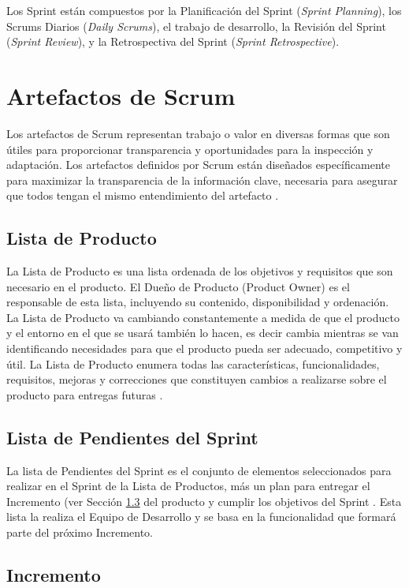 Los Sprint están compuestos por la Planificación del Sprint (\textit{Sprint Planning}), los Scrums Diarios (\textit{Daily Scrums}), el trabajo de desarrollo, la Revisión del Sprint (\textit{Sprint Review}), y la Retrospectiva del Sprint (\textit{Sprint Retrospective}). 

\section{Artefactos de Scrum}
Los artefactos de Scrum representan trabajo o valor en diversas formas que son útiles para proporcionar transparencia y oportunidades para la inspección y adaptación. Los artefactos definidos por Scrum están diseñados específicamente para maximizar la transparencia de la información clave, necesaria para asegurar que todos tengan el mismo entendimiento del artefacto \cite{scrumSchwaber}.

\subsection{Lista de Producto} \label{productBacklog}
La Lista de Producto es una lista ordenada de los objetivos y requisitos que son necesario en el producto. El Dueño de Producto (Product Owner) es el responsable de esta lista, incluyendo su contenido, disponibilidad y ordenación. La Lista de Producto va cambiando constantemente a medida de que el producto y el entorno en el que se usará también lo hacen, es decir cambia mientras se van identificando necesidades para que el producto pueda ser adecuado, competitivo y útil. La Lista de Producto enumera todas las características, funcionalidades, requisitos, mejoras y correcciones que constituyen cambios a realizarse sobre el producto para entregas futuras \cite{scrumSchwaber}.

\subsection{Lista de Pendientes del Sprint} \label{sprintBacklog}
La lista de Pendientes del Sprint es el conjunto de elementos seleccionados para realizar en el Sprint de la Lista de Productos, más un plan para entregar el Incremento (ver Sección \ref{incremento} del producto y cumplir los objetivos del Sprint \cite{scrumSchwaber}. Esta lista la realiza el Equipo de Desarrollo y se basa en la funcionalidad que formará parte del próximo Incremento.

\subsection{Incremento} \label{incremento}

